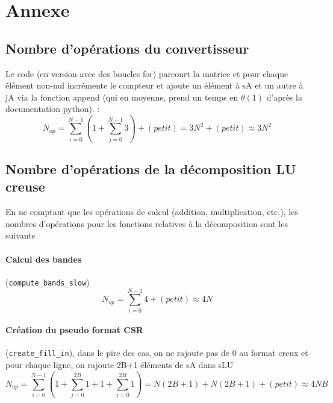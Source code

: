 \documentclass[11pt]{article}
\begin{document}
\section*{Annexe}
\vspace{-10pt}
\subsection*{Nombre d'opérations du convertisseur}
Le code (en version avec des boucles for) parcourt la matrice et pour chaque élément non-nul incrémente le compteur et ajoute un élément à sA et un autre à jA via la fonction append (qui en moyenne, prend un temps en $\theta(1)$ d'après la documentation python). : 
\begin{equation}
    N_{op} = \sum_{i=0}^{N-1} \left(1 + \sum_{j = 0}^{N-1} 3\right) + (petit) = 3N^2 + (petit) \approx 3N^2
\end{equation}
\vspace{-15pt}

\subsection*{Nombre d'opérations de la décomposition LU creuse}
En ne comptant que les opérations de calcul (addition, multiplication, etc.), les nombres d'opérations pour les fonctions relatives à la décomposition sont les suivants
\vspace{-8pt}
\paragraph{Calcul des bandes} (\texttt{compute\_bands\_slow}) 
\begin{equation}
    N_{op} = \sum_{i=0}^{N-1} 4 + (petit) \approx 4N
\end{equation}\label{eq1}
\vspace{-15pt}
\paragraph{Création du pseudo format CSR} (\texttt{create\_fill\_in}), dans le pire des cas, on ne rajoute pas de 0 au format creux et pour chaque ligne, on rajoute 2B+1 éléments de sA dans sLU 
\begin{equation}
    N_{op} = \sum_{i=0}^{N-1} \left(1 + \sum_{j=0}^{2B} 1 + 1 + \sum_{j=0}^{2B} 1\right) = N(2B+1) + N(2B+1) + (petit) \approx 4NB
\end{equation}\label{eq2}
\vspace{-15pt}
\end{document}

